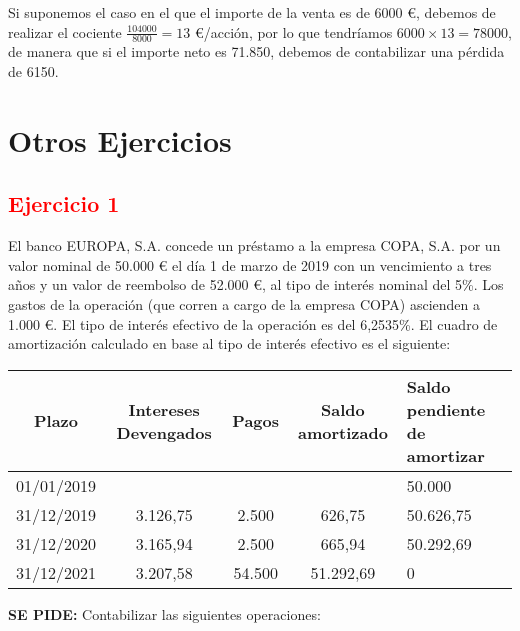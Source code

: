 Si suponemos el caso en el que el importe de la venta es de 6000 €, debemos de realizar el cociente $\frac{104000}{8000} = 13$ \euro/acción, por lo que tendríamos $6000 \times 13 = 78000$, de manera que si el importe neto es 71.850, debemos de contabilizar una pérdida de 6150.

\newpage
\section{Otros Ejercicios}


\subsection*{\textcolor{red}{\textbf{Ejercicio 1}}}

El banco EUROPA, S.A. concede un préstamo a la empresa COPA, S.A. por un valor nominal de 50.000 € el día 1 de marzo de 2019 con un vencimiento a tres años y un valor de reembolso de 52.000 €, al tipo de interés nominal del 5\%. Los gastos de la operación (que corren a cargo de la empresa COPA) ascienden a 1.000 €. El tipo de interés efectivo de la operación es del 6,2535\%. El cuadro de amortización calculado en base al tipo de interés efectivo es el siguiente:

\begin{table}[H]
\centering
\begin{tabular}{|c|c|c|c|p{4cm}|}
    \hline
    Plazo & Intereses Devengados & Pagos & Saldo amortizado & Saldo pendiente de amortizar \\
    \hline
    01/01/2019 & & & & 50.000 \\
    \hline
    31/12/2019 & 3.126,75 & 2.500 & 626,75 & 50.626,75 \\
    \hline
    31/12/2020 & 3.165,94 & 2.500 & 665,94 & 50.292,69 \\
    \hline
    31/12/2021 & 3.207,58 & 54.500 & 51.292,69 & 0 \\
    \hline
\end{tabular}
\end{table}

\textbf{SE PIDE:} Contabilizar las siguientes operaciones:

